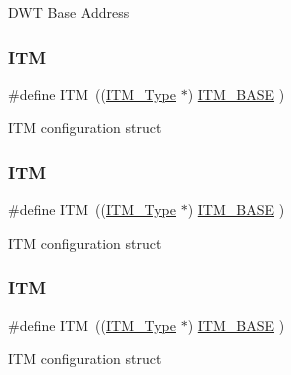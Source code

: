 D\+WT Base Address \mbox{\label{group___c_m_s_i_s__core__base_gabae7cdf882def602cb787bb039ff6a43}} 
\subsubsection{\texorpdfstring{I\+TM}{ITM}\hspace{0.1cm}{\footnotesize\ttfamily [1/4]}}
{\footnotesize\ttfamily \#define I\+TM~((\hyperlink{struct_i_t_m___type}{I\+T\+M\+\_\+\+Type}       $\ast$)     \hyperlink{group___c_m_s_i_s__core__base_gadd76251e412a195ec0a8f47227a8359e}{I\+T\+M\+\_\+\+B\+A\+SE}      )}

I\+TM configuration struct \mbox{\label{group___c_m_s_i_s__core__base_gabae7cdf882def602cb787bb039ff6a43}} 
\subsubsection{\texorpdfstring{I\+TM}{ITM}\hspace{0.1cm}{\footnotesize\ttfamily [2/4]}}
{\footnotesize\ttfamily \#define I\+TM~((\hyperlink{struct_i_t_m___type}{I\+T\+M\+\_\+\+Type}       $\ast$)     \hyperlink{group___c_m_s_i_s__core__base_gadd76251e412a195ec0a8f47227a8359e}{I\+T\+M\+\_\+\+B\+A\+SE}      )}

I\+TM configuration struct \mbox{\label{group___c_m_s_i_s__core__base_gabae7cdf882def602cb787bb039ff6a43}} 
\subsubsection{\texorpdfstring{I\+TM}{ITM}\hspace{0.1cm}{\footnotesize\ttfamily [3/4]}}
{\footnotesize\ttfamily \#define I\+TM~((\hyperlink{struct_i_t_m___type}{I\+T\+M\+\_\+\+Type}       $\ast$)     \hyperlink{group___c_m_s_i_s__core__base_gadd76251e412a195ec0a8f47227a8359e}{I\+T\+M\+\_\+\+B\+A\+SE}      )}

I\+TM configuration struct \mbox{\label{group___c_m_s_i_s__core__base_gabae7cdf882def602cb787bb039ff6a43}} 
